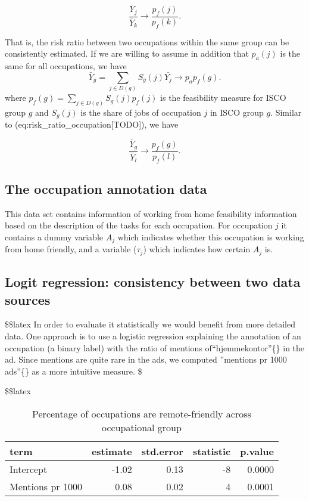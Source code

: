 \documentclass[11pt,]{article}
\begin{document}
\[ \frac{\bar{Y}_{j}}{\bar{Y}_{k}}\longrightarrow\frac{p_{f}(j)}{p_{f}(k)}.\label{eq:risk_ratio_occupation} \]

That is, the risk ratio between two occupations within the same group
can be consistently estimated. If we are willing to assume in addition
that \(p_{a}(j)\) is the same for all occupations, we have \[
\bar{Y}_{g}=\sum_{j\in D(g)}S_{g}(j)\bar{Y_{j}}\longrightarrow p_{a}p_{f}(g).
\] where \(p_{f}(g)=\sum_{j\in D(g)}S_{g}(j)p_{f}(j)\) is the
feasibility measure for ISCO group \(g\) and \(S_{g}(j)\) is the share
of jobs of occupation \(j\) in ISCO group \(g\). Similar to
(eq:risk\_ratio\_occupation{[}TODO{]}), we have

\[ \frac{\bar{Y}_{g}}{\bar{Y}_{l}}\rightarrow\frac{p_{f}(g)}{p_{f}(l)}.\label{eq:risk_ratio_isco} \]

\hypertarget{the-occupation-annotation-data}{%
\subsection{The occupation annotation
data}\label{the-occupation-annotation-data}}

This data set contains information of working from home feasibility
information based on the description of the tasks for each occupation.
For occupation \(j\) it contains a dummy variable \(A_{j}\) which
indicates whether this occupation is working from home friendly, and a
variable (\(\tau_{j}\)) which indicates how certain \(A_{j}\) is.

\hypertarget{logit-regression-consistency-between-two-data-sources}{%
\subsection{Logit regression: consistency between two data
sources}\label{logit-regression-consistency-between-two-data-sources}}

\$\$latex In order to evaluate it statistically we would benefit from
more detailed data. One approach is to use a logistic regression
explaining the annotation of an occupation (a binary label) with the
ratio of mentions of\textquotedblleft hjemmekontor\textquotedblright\{\}
in the ad. Since mentions are quite rare in the ads, we computed
\textquotedblright mentions pr 1000 ads\textquotedblright\{\} as a more
intuitive measure. \$

\$\$latex

\begin{table}[t!]
\setlength\arrayrulewidth{0.75pt}
\centering
\caption{Percentage of occupations are remote-friendly across occupational group}
\begin{tabular}{lrrrr}
\toprule
term & estimate & std.error & statistic & p.value \\ 
\midrule
Intercept & -1.02 & 0.13 & -8 & 0.0000 \\ 
Mentions pr 1000 & 0.08 & 0.02 & 4 & 0.0001 \\ 
\bottomrule
\end{tabular}
\label{tab:logit}
\end{table}
\end{document}
